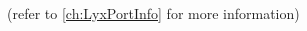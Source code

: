 

\thispagestyle{empty}
\begin{addmargin}[-10mm]{-30mm}  %

\begin{center}
\spacedlowsmallcaps{\myName}
\par\end{center}

\begin{center}
\medskip{}
\begingroup \color{Maroon} \spacedallcaps{\myTitle} \endgroup
\par\end{center}

\begin{center}

\par\end{center}

\vspace{2cm}


\begin{center}
\LyX{} \\
\\
\\

\par\end{center}

\begin{center}
{\scriptsize{}(refer to \autoref{ch:LyxPortInfo} for more information)}\\

\par\end{center}

\end{addmargin}
